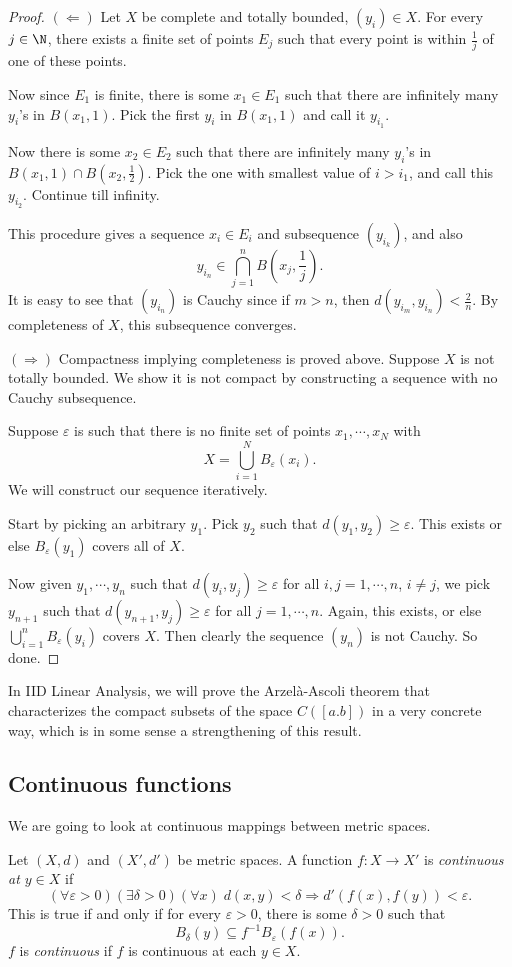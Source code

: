 \documentclass[a4paper]{article}
\begin{document}
\begin{proof}
  $(\Leftarrow)$ Let $X$ be complete and totally bounded, $(y_i) \in X$. For every $j \in \N$, there exists a finite set of points $E_j$ such that every point is within $\frac{1}{j}$ of one of these points.

  Now since $E_1$ is finite, there is some $x_1 \in E_1$ such that there are infinitely many $y_i$'s in $B(x_1, 1)$. Pick the first $y_i$ in $B(x_1, 1)$ and call it $y_{i_1}$.

  Now there is some $x_2 \in E_2$ such that there are infinitely many $y_i$'s in $B(x_1, 1) \cap B(x_2, \frac{1}{2})$. Pick the one with smallest value of $i > i_1$, and call this $y_{i_2}$. Continue till infinity.

  This procedure gives a sequence $x_i \in E_i$ and subsequence $(y_{i_k})$, and also
  \[
    y_{i_n} \in \bigcap_{j = 1}^n B\left(x_j, \frac{1}{j}\right).
  \]
  It is easy to see that $(y_{i_n})$ is Cauchy since if $m > n$, then $d(y_{i_m}, y_{i_n}) < \frac{2}{n}$. By completeness of $X$, this subsequence converges.

  $(\Rightarrow)$ Compactness implying completeness is proved above. Suppose $X$ is not totally bounded. We show it is not compact by constructing a sequence with no Cauchy subsequence.

  Suppose $\varepsilon$ is such that there is no finite set of points $x_1, \cdots, x_N$ with
  \[
    X = \bigcup_{i = 1}^N B_\varepsilon (x_i).
  \]
  We will construct our sequence iteratively.

  Start by picking an arbitrary $y_1$. Pick $y_2$ such that $d(y_1, y_2) \geq \varepsilon$. This exists or else $B_\varepsilon(y_1)$ covers all of $X$.

  Now given $y_1, \cdots, y_n$ such that $d(y_i, y_j) \geq \varepsilon$ for all $i, j = 1, \cdots, n$, $i \not= j$, we pick $y_{n + 1}$ such that $d(y_{n + 1}, y_j) \geq \varepsilon$ for all $j = 1, \cdots, n$. Again, this exists, or else $\bigcup_{i = 1}^n B_\varepsilon(y_i)$ covers $X$. Then clearly the sequence $(y_n)$ is not Cauchy. So done.
\end{proof}
In IID Linear Analysis, we will prove the Arzel\`a-Ascoli theorem that characterizes the compact subsets of the space $C([a. b])$ in a very concrete way, which is in some sense a strengthening of this result.

\subsection{Continuous functions}
We are going to look at continuous mappings between metric spaces.
\begin{defi}[Continuity]
  Let $(X, d)$ and $(X', d')$ be metric spaces. A function $f: X \to X'$ is \emph{continuous at $y \in X$} if
  \[
    (\forall \varepsilon > 0)(\exists \delta > 0)(\forall x)\; d(x, y) < \delta \Rightarrow d'(f(x), f(y)) < \varepsilon.
  \]
  This is true if and only if for every $\varepsilon > 0$, there is some $\delta > 0$ such that
  \[
    B_\delta(y) \subseteq f^{-1}B_\varepsilon(f(x)).
  \]
  $f$ is \emph{continuous} if $f$ is continuous at each $y \in X$.
\end{defi}
\end{document}

